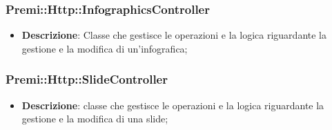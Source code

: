 	\subsubsection*{Premi::Http::InfographicsController}
			\begin{itemize}
				\item \textbf{Descrizione}: Classe che gestisce le operazioni e la logica riguardante la gestione e la modifica di un'\gls{infografica};
			\end{itemize}
			
	\subsubsection*{Premi::Http::SlideController}
			\begin{itemize}
				\item \textbf{Descrizione}: classe che gestisce le operazioni e la logica riguardante la gestione e la modifica di una \gls{slide};
			\end{itemize}
		
\newpage

